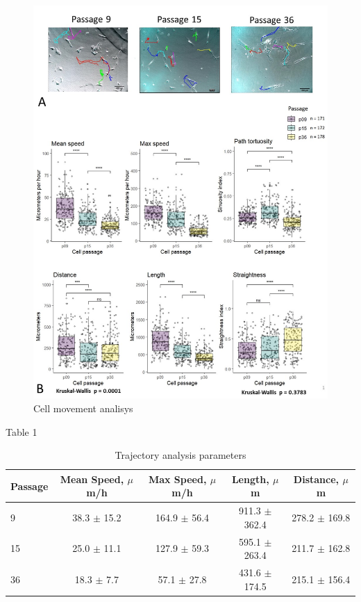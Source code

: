 \documentclass[english,authoryear]{elsarticle}
\begin{document}
\begin{figure}
  \includegraphics[width=1\linewidth]{fig_traj.jpg}
  \caption{Cell movement analisys}
  \label{traj}
  \centering
\end{figure}

Table 1

\begin{table}
  \caption{Trajectory analysis parameters}
  \label{tab3}
\centering
\begin{tabular}{|l|c|c|c|c|}
 \hline
 Passage & Mean Speed, $\mu$m/h & Max Speed, $\mu$m/h & Length, $\mu$m  & Distance, $\mu$m \\
 \hline
 9 & 38.3 $\pm$ 15.2 & 164.9 $\pm$ 56.4 & 911.3 $\pm$ 362.4 &  278.2 $\pm$ 169.8 \\
 15 & 25.0 $\pm$ 11.1 & 127.9 $\pm$ 59.3& 595.1 $\pm$ 263.4 & 211.7 $\pm$ 162.8  \\
 36 & 18.3 $\pm$ 7.7 & 57.1 $\pm$ 27.8 & 431.6 $\pm$ 174.5 & 215.1 $\pm$ 156.4 \\
 \hline
\end{tabular}
\end{table}
\end{document}
